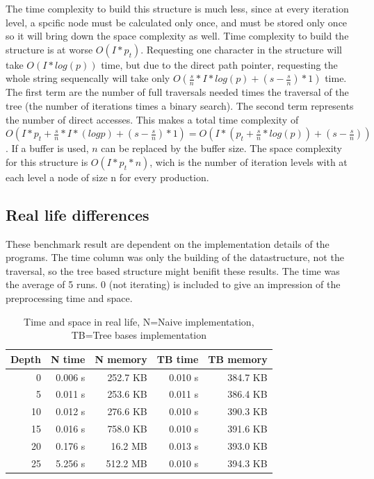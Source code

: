 \documentclass[11pt,a4paper]{article}
\begin{document}
The time complexity to build this structure is much less, since at every iteration level, a spcific node must be calculated only once, and must be stored only once so it will bring down the space complexity as well.
Time complexity to build the structure is at worse $O(I*p_t)$.
Requesting one character in the structure will take $O(I*log(p))$ time, but due to the direct path pointer, requesting the whole string sequencally will take only $O(\frac{s}{n} * I*log(p) + (s-\frac{s}{n}) * 1)$ time. The first term are the number of full traversals needed times the traversal of the tree (the number of iterations times a binary search). The second term represents the number of direct accesses. This makes a total time complexity of $O(I*p_t + \frac{s}{n} * I*(log p) + (s-\frac{s}{n}) * 1) = O(I * (p_t + \frac{s}{n} * log(p)) + (s - \frac{s}{n}))$. If a buffer is used, $n$ can be replaced by the buffer size.
The space complexity for this structure is $O(I*p_t*n)$, wich is the number of iteration levels with at each level a node of size n for every production.

\subsection{Real life differences} %

These benchmark result are dependent on the implementation details of the programs. The time column was only the building of the datastructure, not the traversal, so the tree based structure might benifit these results. The time was the average of 5 runs. 0 (not iterating) is included to give an impression of the preprocessing time and space.

\begin{table}
\center
\begin{tabular}{r r r r r}
Depth & N time & N memory & TB time & TB memory \\ \hline
0  & 0.006 s & 252.7 KB & 0.010 s & 384.7 KB \\ \hline
5  & 0.011 s & 253.6 KB & 0.011 s & 386.4 KB \\ \hline
10 & 0.012 s & 276.6 KB & 0.010 s & 390.3 KB \\ \hline
15 & 0.016 s & 758.0 KB & 0.010 s & 391.6 KB \\ \hline
20 & 0.176 s &  16.2 MB & 0.013 s & 393.0 KB \\ \hline
25 & 5.256 s & 512.2 MB & 0.010 s & 394.3 KB \\
\end{tabular}
\caption{Time and space in real life, N=Naive implementation, TB=Tree bases implementation}
\end{table}
\end{document}
